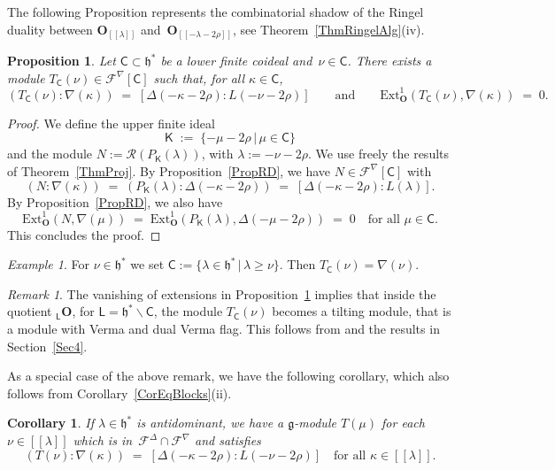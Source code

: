 \documentclass[11pt]{amsart}
\newcommand{\CCC}{\mathsf{C}}
\newcommand{\lbra}{[\![}
\newcommand{\rbra}{]\!]}
\newcommand{\RR}{\mathscr{R}}
\newcommand{\LLL}{\mathsf{L}}
\newcommand{\KKK}{\mathsf{K}}
\newcommand{\cF}{{\mathcal{F}}}
\newcommand{\bO}{\mathbf{O}}
\newcommand{\Ext}{\mathrm{Ext}}
\newcommand{\fg}{\mathfrak{g}}
\newcommand{\fh}{\mathfrak{h}}
\numberwithin{equation}{section}
\theoremstyle{plain}
\newtheorem{prop}[subsubsection]{Proposition}
\newtheorem{cor}[subsubsection]{Corollary}
\theoremstyle{remark}
\newtheorem{rem}[subsubsection]{Remark}
\theoremstyle{remark}
\newtheorem{ex}[subsubsection]{Example}
\theoremstyle{construction}
\begin{document}
The following Proposition represents the combinatorial shadow of the Ringel duality between $\bO_{\lbra\lambda\rbra}$ and~$\bO_{\lbra-\lambda-2\rho\rbra}$, see Theorem~\ref{ThmRingelAlg}(iv).
\begin{prop} \label{PropRing2}
Let $\CCC\subset\fh^\ast$ be a lower finite coideal and~$\nu\in\CCC$. There exists a module $T_{\CCC}(\nu)\in \cF^{\nabla}[\CCC]$ such that, for all $\kappa\in\CCC$,
$$(T_{\CCC}(\nu):\nabla(\kappa))\;=\;[\Delta(-\kappa-2\rho):L(-\nu-2\rho)]\qquad\mbox{and}\qquad \Ext^1_{\bO}(T_{\CCC}(\nu),\nabla(\kappa))\;=\;0.$$
\end{prop}
\begin{proof}
We define the upper finite ideal
$$\KKK\;:=\;\{-\mu-2\rho\,|\, \mu\in\CCC\}$$
and the module $N:=\RR(P_{\KKK}(\lambda))$, with $\lambda:=-\nu-2\rho$. We use freely the results of Theorem~\ref{ThmProj}. By Proposition~\ref{PropRD}, we have $N\in \cF^{\nabla}[\CCC]$ with
$$(N:\nabla(\kappa))\;=\; (P_{\KKK}(\lambda):\Delta(-\kappa-2\rho))\;=\;[\Delta(-\kappa-2\rho):L(\lambda)].$$
By Proposition~\ref{PropRD}, we also have
$$\Ext^1_{\bO}(N,\nabla(\mu))\;=\;\Ext^1_{\bO}(P_{\KKK}(\lambda),\Delta(-\mu-2\rho))\;=\;0\quad\mbox{for all $\mu\in\CCC$}.$$
This concludes the proof.\end{proof}

\begin{ex}
For $\nu\in\fh^\ast$ we set $\CCC:=\{\lambda\in\fh^\ast\,|\, \lambda\ge\nu\}$. Then  $T_{\CCC}(\nu)=\nabla(\nu)$.
\end{ex}

\begin{rem}
The vanishing of extensions in Proposition~\ref{PropRing2} implies that inside the quotient ${}_{\LLL}\bO$, for $\LLL=\fh^\ast\backslash\CCC$, the module $T_{\CCC}(\nu)$ becomes a tilting module, that is a module with Verma and dual Verma flag. This follows from \cite[Theorem~4]{Ringel} and the results in Section~\ref{Sec4}.
\end{rem}

As a special case of the above remark, we have the following corollary, which also follows from Corollary~\ref{CorEqBlocks}(ii). %

\begin{cor}
If $\lambda\in\fh^\ast$ is antidominant, we have a $\fg$-module $T(\mu)$ for each $\nu\in \lbra\lambda\rbra$ which is in~$\cF^{\Delta}\cap\cF^{\nabla}$ and satisfies
$$(T(\nu):\nabla(\kappa))\;=\;[\Delta(-\kappa-2\rho):L(-\nu-2\rho)]\quad\mbox{for all $\kappa\in \lbra\lambda\rbra$.}$$

\end{cor}
\end{document}

